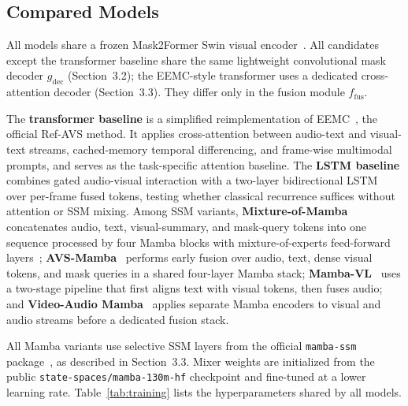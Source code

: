 \documentclass[a4paper,12pt]{extarticle}
\begin{document}
\subsection{Compared Models}

All models share a frozen Mask2Former Swin visual encoder~\cite{cheng2022mask2former, avsegformer2023}. All candidates except the transformer baseline share the same lightweight convolutional mask decoder $g_{\mathrm{dec}}$ (Section~3.2); the EEMC-style transformer uses a dedicated cross-attention decoder (Section~3.3). They differ only in the fusion module $f_{\mathrm{fus}}$.

The \textbf{transformer baseline} is a simplified reimplementation of EEMC~\cite{wang2024refavs}, the official Ref-AVS method. It applies cross-attention between audio-text and visual-text streams, cached-memory temporal differencing, and frame-wise multimodal prompts, and serves as the task-specific attention baseline. The \textbf{LSTM baseline} combines gated audio-visual interaction with a two-layer bidirectional LSTM~\cite{hochreiter1997long} over per-frame fused tokens, testing whether classical recurrence suffices without attention or SSM mixing. Among SSM variants, \textbf{Mixture-of-Mamba}~\cite{mixturemamba2025} concatenates audio, text, visual-summary, and mask-query tokens into one sequence processed by four Mamba blocks with mixture-of-experts feed-forward layers~\cite{shazeer2017outrageously}; \textbf{AVS-Mamba}~\cite{zhu2024vlmamba, coupledmamba2024} performs early fusion over audio, text, dense visual tokens, and mask queries in a shared four-layer Mamba stack; \textbf{Mamba-VL}~\cite{zhu2024vlmamba} uses a two-stage pipeline that first aligns text with visual tokens, then fuses audio; and \textbf{Video-Audio Mamba}~\cite{coupledmamba2024, erol2024audiomamba} applies separate Mamba encoders to visual and audio streams before a dedicated fusion stack.

All Mamba variants use selective SSM layers from the official \texttt{mamba-ssm} package~\cite{mambassm2024, dao2024mamba}, as described in Section~3.3. Mixer weights are initialized from the public \texttt{state-spaces/mamba-130m-hf} checkpoint and fine-tuned at a lower learning rate. Table~\ref{tab:training} lists the hyperparameters shared by all models.
\end{document}
